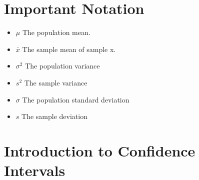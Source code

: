\title{}
\author{}



\maketitle

\section{Important Notation}
\begin{itemize}
\item $\mu$ The population mean.
\item $\bar{x}$ The sample mean of sample x.
\item $\sigma^2$ The population variance
\item $s^2$ The sample variance
\item $\sigma$ The population standard deviation
\item $s$ The sample deviation
\end{itemize}
\section{Introduction to Confidence Intervals}

